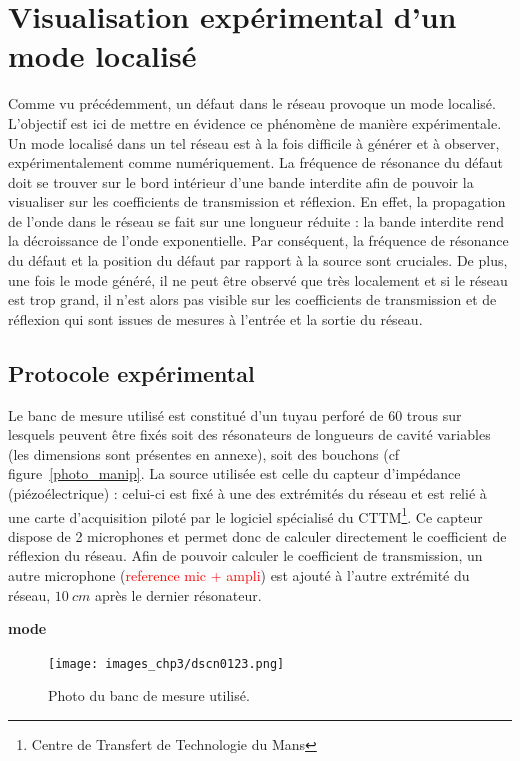 \chapter{Visualisation expérimental d'un mode localisé}
Comme vu précédemment, un défaut dans le réseau provoque un mode localisé. L'objectif est ici de mettre en évidence ce phénomène de manière expérimentale.\\


Un mode localisé dans un tel réseau est à la fois difficile à générer et à observer, expérimentalement comme numériquement. La fréquence de résonance du défaut doit se trouver sur le bord intérieur d'une bande interdite afin de pouvoir la visualiser sur les coefficients de transmission et réflexion. En effet, la propagation de l'onde dans le réseau se fait sur une longueur réduite : la bande interdite rend la décroissance de l'onde exponentielle. Par conséquent, la fréquence de résonance du défaut et la position du défaut par rapport à la source sont cruciales. De plus, une fois le mode généré, il ne peut être observé que très localement et si le réseau est trop grand, il n'est alors pas visible sur les coefficients de transmission et de réflexion qui sont issues de mesures à l'entrée et la sortie du réseau.


\section{Protocole expérimental}
Le banc de mesure utilisé est constitué d'un tuyau perforé de 60 trous sur lesquels peuvent être fixés soit des résonateurs de longueurs de cavité variables (les dimensions sont présentes en annexe), soit des bouchons (cf figure~\ref{photo_manip}. La source utilisée est celle du capteur d'impédance (piézoélectrique) : celui-ci est fixé à une des extrémités du réseau et est relié à une carte d'acquisition piloté par le logiciel spécialisé du CTTM\footnote{Centre de Transfert de Technologie du Mans}. Ce capteur dispose de 2 microphones et permet donc de calculer directement le coefficient de réflexion du réseau. Afin de pouvoir calculer le coefficient de transmission, un autre microphone (\textcolor{red}{reference mic + ampli}) est ajouté à l'autre extrémité du réseau, $10~cm$ après le dernier résonateur.


\textbf{mode }

\begin{figure}
	\centering
	\texttt{[image: images\_chp3/dscn0123.png]}
	\caption{Photo du banc de mesure utilisé.}
\end{figure}

